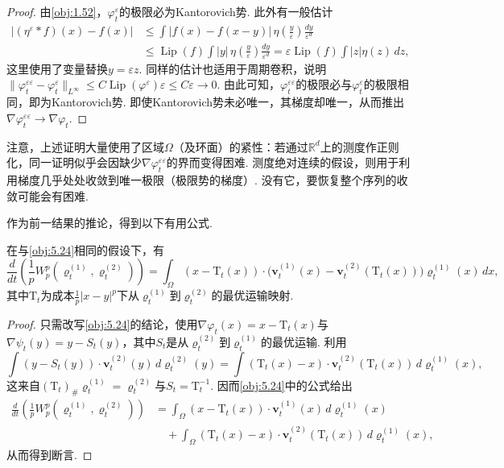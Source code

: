 \begin{proof}
由\autoref{obj:1.52}，$\varphi_t^\varepsilon$的极限必为Kantorovich势. 此外有一般估计
\[
\begin{aligned}
|(\eta^\varepsilon*f)(x)-f(x)|
&\le\int|f(x)-f(x-y)|\,\eta\left(\frac y\varepsilon\right)\frac{dy}{\varepsilon^d}\\
&\le\operatorname{Lip}(f)\int|y|\,\eta\left(\frac y\varepsilon\right)\frac{dy}{\varepsilon^d}
=\varepsilon\operatorname{Lip}(f)\int|z|\eta(z)\,dz,
\end{aligned}
\]
这里使用了变量替换$y=\varepsilon z$. 同样的估计也适用于周期卷积，说明
$\|\varphi_t^{\varepsilon\varepsilon}-\varphi_t^\varepsilon\|_{L^\infty}\le C\operatorname{Lip}(\varphi^\varepsilon)\varepsilon\le C\varepsilon\to0$.
由此可知，$\varphi_t^{\varepsilon\varepsilon}$的极限必与$\varphi_t^\varepsilon$的极限相同，即为Kantorovich势. 即使Kantorovich势未必唯一，其梯度却唯一，从而推出$\nabla\varphi_t^{\varepsilon\varepsilon}\to\nabla\varphi_t$.
\end{proof}

注意，上述证明大量使用了区域$\Omega$（及环面）的紧性：若通过$\mathbb R^d$上的测度作正则化，同一证明似乎会因缺少$\nabla\varphi_t^{\varepsilon\varepsilon}$的界而变得困难. 测度绝对连续的假设，则用于利用梯度几乎处处收敛到唯一极限（极限势的梯度）. 没有它，要恢复整个序列的收敛可能会有困难.

作为前一结果的推论，得到以下有用公式.

\begin{corollary}\label{obj:5.25}
在与\autoref{obj:5.24}相同的假设下，有
\[
\frac d{dt}\left(\frac1pW_p^p(\varrho_t^{(1)},\varrho_t^{(2)})\right)
=\int_\Omega(x-\mathrm T_t(x))\cdot\bigl(\mathbf v_t^{(1)}(x)-\mathbf v_t^{(2)}(\mathrm T_t(x))\bigr)\varrho_t^{(1)}(x)\,dx,
\]
其中$\mathrm T_t$为成本$\frac1p|x-y|^p$下从$\varrho_t^{(1)}$到$\varrho_t^{(2)}$的最优运输映射.
\end{corollary}
\begin{proof}
只需改写\autoref{obj:5.24}的结论，使用$\nabla\varphi_t(x)=x-\mathrm T_t(x)$与$\nabla\psi_t(y)=y-S_t(y)$，其中$S_t$是从$\varrho_t^{(2)}$到$\varrho_t^{(1)}$的最优运输. 利用
\[
\int(y-S_t(y))\cdot\mathbf v_t^{(2)}(y)\,d\varrho_t^{(2)}(y)
=\int(\mathrm T_t(x)-x)\cdot\mathbf v_t^{(2)}(\mathrm T_t(x))\,d\varrho_t^{(1)}(x),
\]
这来自$(\mathrm T_t)_\#\varrho_t^{(1)}=\varrho_t^{(2)}$与$S_t=\mathrm T_t^{-1}$. 因而\autoref{obj:5.24}中的公式给出
\[
\begin{aligned}
\frac d{dt}\left(\frac1pW_p^p(\varrho_t^{(1)},\varrho_t^{(2)})\right)
&=\int_\Omega(x-\mathrm T_t(x))\cdot\mathbf v_t^{(1)}(x)\,d\varrho_t^{(1)}(x)\\
&\quad+\int_\Omega(\mathrm T_t(x)-x)\cdot\mathbf v_t^{(2)}(\mathrm T_t(x))\,d\varrho_t^{(1)}(x),
\end{aligned}
\]
从而得到断言.
\end{proof}

